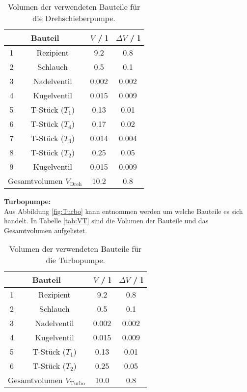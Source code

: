 \begin{table}[H] %
  \centering
  \caption{Volumen der verwendeten Bauteile für die Drehschieberpumpe.}
  \label{tab:VD}
  \begin{tabular}{c|c|c|c}
    \multicolumn{2}{c|}{Bauteil} & $V$ / l & $\Delta V$ / l \\
    \midrule
    1 & Rezipient & 9.2 & 0.8 \\
    2 & Schlauch & 0.5 & 0.1 \\
    3 & Nadelventil & 0.002 & 0.002 \\
    4 & Kugelventil & 0.015 & 0.009 \\
    5 & T-Stück ($T_1$) & 0.13 & 0.01 \\
    6 & T-Stück ($T_4$) & 0.17 & 0.02 \\
    7 & T-Stück ($T_3$) & 0.014 & 0.004 \\
    8 & T-Stück ($T_2$) & 0.25 & 0.05 \\
    9 & Kugelventil & 0.015 & 0.009 \\
    \midrule
    \multicolumn{2}{c|}{Gesamtvolumen $V_\text{Dreh}$} & 10.2 & 0.8 \\
  \end{tabular}
\end{table}

\textbf{Turbopumpe:} \\
Aus Abbildung \eqref{fig:Turbo} kann entnommen werden um welche Bauteile es sich handelt. In Tabelle \eqref{tab:VT} sind die Volumen der Bauteile und das Gesamtvolumen aufgelistet.

\begin{table}[H] %
  \centering
  \caption{Volumen der verwendeten Bauteile für die Turbopumpe.}
  \label{tab:VT}
  \begin{tabular}{c|c|c|c}
    \multicolumn{2}{c|}{Bauteil} & $V$ / l & $\Delta V$ / l \\
    \midrule
    1 & Rezipient & 9.2 & 0.8 \\
    2 & Schlauch & 0.5 & 0.1 \\
    3 & Nadelventil & 0.002 & 0.002 \\
    4 & Kugelventil & 0.015 & 0.009 \\
    5 & T-Stück ($T_1$) & 0.13 & 0.01 \\
    6 & T-Stück ($T_2$) & 0.25 & 0.05 \\
    \midrule
    \multicolumn{2}{c|}{Gesamtvolumen $V_\text{Turbo}$} & 10.0 & 0.8 \\
  \end{tabular}
\end{table}



